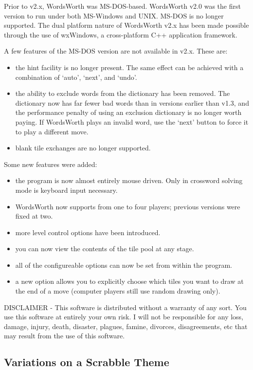 Prior to v2.x, WordsWorth was MS-DOS-based. WordsWorth v2.0 was the
first version to run under both MS-Windows and UNIX. MS-DOS is no longer
supported. The dual platform nature of WordsWorth v2.x has been made
possible through the use of wxWindows, a cross-platform C++
application framework.

A few features of the MS-DOS version are not available in v2.x. These
are:

\begin{itemize}
\item the hint facility is no longer present. The same effect can be
achieved with a combination of `auto', `next', and `undo'.
\item the ability to exclude words from the dictionary has been 
removed. The dictionary now has far fewer bad words than in versions 
earlier than v1.3, and the performance penalty of using an exclusion
dictionary is no longer worth paying. If WordsWorth plays an invalid
word, use the `next' button to force it to play a different
move.
\item blank tile exchanges are no longer supported.
\end{itemize}

Some new features were added:

\begin{itemize}
\item the program is now almost entirely mouse driven. Only in
crossword solving mode is keyboard input necessary.
\item WordsWorth now supports from one to four players; previous
versions were fixed at two.
\item more level control options have been introduced.
\item you can now view the contents of the tile pool at any stage.
\item all of the configureable options can now be set from within
the program.
\item a new option allows you to explicitly choose which tiles you
want to draw at the end of a move (computer players still use random
drawing only).
\end{itemize}

DISCLAIMER - This software is distributed without a warranty of 
any sort. You use this software at entirely your own risk. I will
not be responsible for any loss, damage, injury, death, disaster,
plagues, famine, divorces, disagreements, etc that may result from
the use of this software.

\subsection{Variations on a Scrabble Theme}

